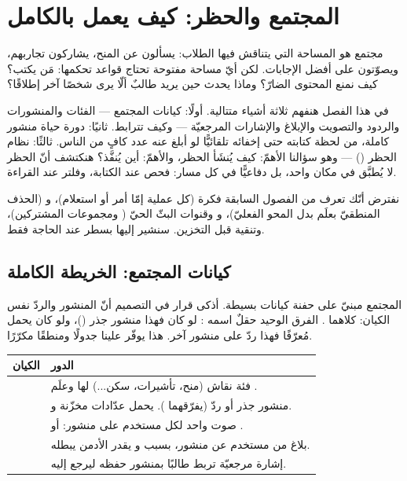 \section{المجتمع والحظر: كيف يعمل بالكامل}

مجتمع  هو المساحة التي يتناقش فيها الطلاب: يسألون عن المنح، يشاركون
تجاربهم، ويصوّتون على أفضل الإجابات. لكن أيّ مساحة مفتوحة تحتاج قواعد تحكمها: مَن
يكتب؟ كيف نمنع المحتوى الضارّ؟ وماذا يحدث حين يريد طالبٌ ألّا يرى شخصًا آخر إطلاقًا؟

في هذا الفصل هنفهم ثلاثة أشياء متتالية. أولًا: كيانات المجتمع — الفئات والمنشورات
والردود والتصويت والإبلاغ والإشارات المرجعيّة — وكيف تترابط. ثانيًا: دورة حياة منشور
كاملة، من لحظة كتابته حتى إخفائه تلقائيًّا لو أبلغ عنه عدد كافٍ من الناس. ثالثًا: نظام
الحظر () — وهو سؤالنا الأهمّ: كيف يُنشَأ الحظر، والأهمّ: أين يُنفَّذ؟
هنكتشف أنّ الحظر لا يُطبَّق في مكان واحد، بل دفاعيًّا في كل مسار: فحص عند الكتابة،
وفلتر عند القراءة.

نفترض أنّك تعرف من الفصول السابقة فكرة  (كل عملية إمّا أمر أو استعلام)،
و (الحذف المنطقيّ بعلَم بدل المحو الفعليّ)، و وقنوات البثّ
الحيّ ( ومجموعات المشتركين)، وتنقية  قبل التخزين. سنشير إليها بسطر
عند الحاجة فقط.

\subsection{كيانات المجتمع: الخريطة الكاملة}

المجتمع مبنيّ على حفنة كيانات بسيطة. أذكى قرار في التصميم أنّ المنشور والردّ نفس
الكيان: كلاهما . الفرق الوحيد حقلٌ اسمه : لو كان
 فهذا منشور جذر ()، ولو كان يحمل مُعرّفًا فهذا ردّ على منشور آخر.
هذا يوفّر علينا جدولًا ومنطقًا مكرّرًا.

\begin{center}
\begin{tabular}{L{3.2cm} L{9cm}}
\toprule
الكيان & الدور \\
\midrule
{} & فئة نقاش (منح، تأشيرات، سكن...) لها  وعلَم . \\
 & منشور جذر أو ردّ (يفرّقهما ). يحمل عدّادات مخزّنة و. \\
 & صوت واحد لكل مستخدم على منشور:  أو . \\
 & بلاغ من مستخدم عن منشور، بسبب و يقدر الأدمن يبطله. \\
 & إشارة مرجعيّة تربط طالبًا بمنشور حفظه ليرجع إليه. \\
\bottomrule
\end{tabular}
\end{center}

